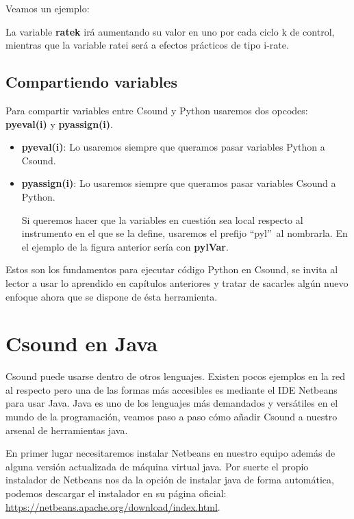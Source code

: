 Veamos un ejemplo:


La variable \textbf{ratek} irá aumentando su valor en uno por cada ciclo k de control, mientras que la variable ratei será a efectos prácticos de tipo i-rate.

\subsection{Compartiendo variables}

Para compartir variables entre Csound y Python usaremos dos opcodes: \textbf{pyeval(i)} y \textbf{pyassign(i)}.
\begin{itemize}
 \item \textbf{pyeval(i)}: Lo usaremos siempre que queramos pasar variables Python a Csound. 
 
 
 \item \textbf{pyassign(i)}: Lo usaremos siempre que queramos pasar variables Csound a Python. 
 

Si queremos hacer que la variables en cuestión sea local respecto al instrumento en el que se la define, usaremos el prefijo ``pyl''\ al nombrarla. En el ejemplo de la figura anterior sería con \textbf{pylVar}.
\end{itemize}

Estos son los fundamentos para ejecutar código Python en Csound, se invita al lector a usar lo aprendido en capítulos anteriores y tratar de sacarles algún nuevo enfoque ahora que se dispone de ésta herramienta.
\pagebreak

\section{Csound en Java}

Csound puede usarse dentro de otros lenguajes. Existen pocos ejemplos en la red al respecto pero una de las formas más accesibles es mediante el IDE Netbeans para usar Java. Java es uno de los lenguajes más demandados y versátiles en el mundo de la programación, veamos paso a paso cómo añadir Csound a nuestro arsenal de herramientas java.
\bigskip


En primer lugar necesitaremos instalar Netbeans en nuestro equipo además de alguna versión actualizada de máquina virtual java. Por suerte el propio instalador de Netbeans nos da la opción de instalar java de forma automática, podemos descargar el instalador en su página oficial: \url{https://netbeans.apache.org/download/index.html}.

